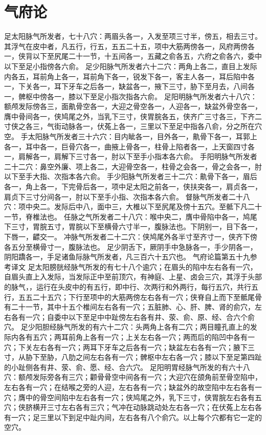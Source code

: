 \documentclass[a4paper,12pt,UTF8,twoside]{ctexbook}
\begin{document}
\chapter{气府论}
足太阳脉气所发者，七十八穴：两眉头各一，入发至项三寸半，傍五，相去三寸。其浮气在皮中者，凡五行，行五，五五二十五，项中大筋两傍各一，风府两傍各一，侠背以下至尻尾二十一节，十五间各一，五藏之俞各五，六府之俞各六，委中以下至足小指傍各六俞。
足少阳脉气所发者六十二穴：两角上各二，直目上发际内各五，耳前角上各一，耳前角下各一，锐发下各一，客主人各一，耳后陷中各一，下关各一，耳下牙车之后各一，缺盆各一，掖下三寸，胁下至月去，八间各一，髀枢中傍各一，膝以下至足小指次指各六俞。
足阳明脉气所发者六十八穴：额颅发际傍各三，面鼽骨空各一，大迎之骨空各一，人迎各一，缺盆外骨空各一，膺中骨间各一，侠鸠尾之外，当乳下三寸，侠胃脘各五，侠齐广三寸各三，下齐二寸侠之各三，气街动脉各一，伏菟上各一，三里以下至足中指各八俞，分之所在穴空。
手太阳脉气所发者三十六穴：目内眦各一，目外各一，鼽骨下各一，耳郭上各一，耳中各一，巨骨穴各一，曲掖上骨各一，柱骨上陷者各一，上天窗四寸各一，肩解各一，肩解下三寸各一，肘以下至手小指本各六俞。
手阳明脉气所发者二十二穴：鼻空外廉、项上各二，大迎骨空各一，柱骨之会各一，骨之会各一，肘以下至手大指、次指本各六俞。
手少阳脉气所发者三十二穴：鼽骨下各一，眉后各一，角上各一，下完骨后各一，项中足太阳之前各一，侠扶突各一，肩贞各一，肩贞下三寸分间各一，肘以下至手小指、次指本各六俞。
督脉气所发者二十八穴：项中央二。发际后中八，面中三，大椎以下至尻尾及傍十五穴。至骶下凡二十一节，脊椎法也。
任脉之气所发者二十八穴：喉中央二，膺中骨陷中各一，鸠尾下三寸，胃脘五寸，胃脘以下至横骨六寸半一，腹脉法也。下阴别一，目下各一，下唇一，齽交一。
冲脉气所发者二十二穴：侠鸠尾外各半寸至齐寸一，侠齐下傍各五分至横骨寸一，腹脉法也。
足少阴舌下，厥阴手中急脉各一，手少阴各一，阴阳蹻各一，手足诸鱼际脉气所发者，凡三百六十五穴也。
气府论篇第五十九参考译文
足太阳膀胱经脉气所发的有七十八个逾穴；在眉头的陷中左右各有一穴，自眉头直上入发际，当发际正中至前顶穴，有神庭、上星、卤会三穴，其浮于头部的脉气，，运行在头皮中的有五行，即中行、次两行和外两行，每行五穴，共行五行，五五二十五穴；下行至项中的大筋两傍左右各有一穴；侠脊自上而下至骶尾骨有二十一节，其中十五个椎间左右各有一穴；五脏肺、心、肝、脾、肾的俞穴，左右各有一穴；自委中以下至足中中趾傍左右各有井、荥、俞、原、经、合六个俞穴。
足少阳胆经脉气所发的有六十二穴：头两角上各有二穴；两目瞳孔直上的发际内各有五穴；两耳前角上各有一穴；上关左右各一穴；两而后的陷凹中各有一穴；下关左右各有一穴；两耳下牙车之后各有一穴；缺盆左右各有一穴；腋下三寸，从胁下至胁，八肋之间左右各有一穴；髀枢中左右各一穴；膝以下至足第四趾的小趾侧各有井、荥、俞、愿、经、合六穴。
足阳明胃经脉气所发的有六十八穴：额颅发际旁各有三穴；颧骨骨空中间各有一穴；大迎穴在颌角前至骨空陷中，左右各有一穴；在结喉之旁的人迎，左右各有一穴；缺盆外的故空陷中左右各有一穴；膺中的骨空间陷中左右各有一穴；侠鸠尾之外，乳下三寸，侠胃脘左右各有五穴；侠脐横开三寸左右各有三穴；气冲在动脉跳动处左右各一穴；在伏菟上左右各有一穴；足三里以下到足中趾内间，左右各有八个俞穴。以上每个穴都有它一定的空穴。
\end{document}
